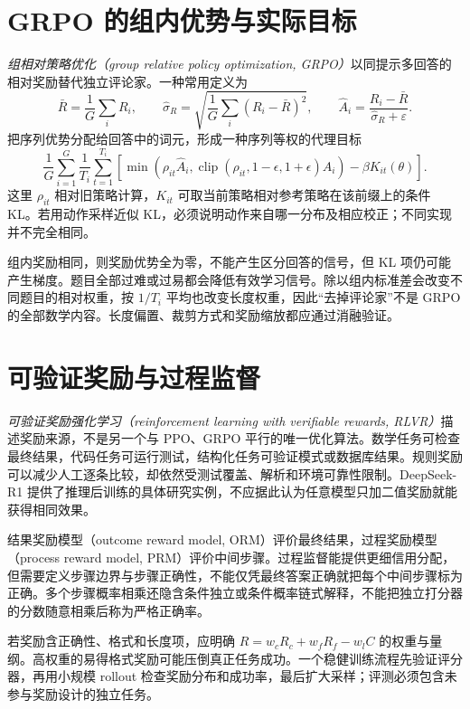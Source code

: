 \section{GRPO 的组内优势与实际目标}

\emph{组相对策略优化（group relative policy optimization, GRPO）}以同提示多回答的相对奖励替代独立评论家\cite{grpo}。一种常用定义为
\begin{equation}
\bar R=\frac1G\sum_iR_i,\qquad
\widehat\sigma_R=\sqrt{\frac1G\sum_i(R_i-\bar R)^2},\qquad
\widehat A_i=\frac{R_i-\bar R}{\widehat\sigma_R+\varepsilon}.
\label{eq:grpo-adv}
\end{equation}
把序列优势分配给回答中的词元，形成一种序列等权的代理目标
\[
\frac1G\sum_{i=1}^G\frac1{T_i}\sum_{t=1}^{T_i}
\left[\min\!\left(\rho_{it}\widehat A_i,
\operatorname{clip}(\rho_{it},1-\epsilon,1+\epsilon)\widehat A_i\right)
-\beta K_{it}(\theta)\right].
\]
这里 $\rho_{it}$ 相对旧策略计算，$K_{it}$ 可取当前策略相对参考策略在该前缀上的条件 KL。若用动作采样近似 KL，必须说明动作来自哪一分布及相应校正；不同实现并不完全相同。

组内奖励相同，则奖励优势全为零，不能产生区分回答的信号，但 KL 项仍可能产生梯度。题目全部过难或过易都会降低有效学习信号。除以组内标准差会改变不同题目的相对权重，按 $1/T_i$ 平均也改变长度权重，因此“去掉评论家”不是 GRPO 的全部数学内容。长度偏置、裁剪方式和奖励缩放都应通过消融验证。

\section{可验证奖励与过程监督}

\emph{可验证奖励强化学习（reinforcement learning with verifiable rewards, RLVR）}描述奖励来源，不是另一个与 PPO、GRPO 平行的唯一优化算法。数学任务可检查最终结果，代码任务可运行测试，结构化任务可验证模式或数据库结果。规则奖励可以减少人工逐条比较，却依然受测试覆盖、解析和环境可靠性限制。DeepSeek-R1 提供了推理后训练的具体研究实例\cite{r1}，不应据此认为任意模型只加二值奖励就能获得相同效果。

结果奖励模型（outcome reward model, ORM）评价最终结果，过程奖励模型（process reward model, PRM）评价中间步骤。过程监督能提供更细信用分配，但需要定义步骤边界与步骤正确性，不能仅凭最终答案正确就把每个中间步骤标为正确\cite{prm}。多个步骤概率相乘还隐含条件独立或条件概率链式解释，不能把独立打分器的分数随意相乘后称为严格正确率。

若奖励含正确性、格式和长度项，应明确 $R=w_cR_c+w_fR_f-w_lC$ 的权重与量纲。高权重的易得格式奖励可能压倒真正任务成功。一个稳健训练流程先验证评分器，再用小规模 rollout 检查奖励分布和成功率，最后扩大采样；评测必须包含未参与奖励设计的独立任务。

